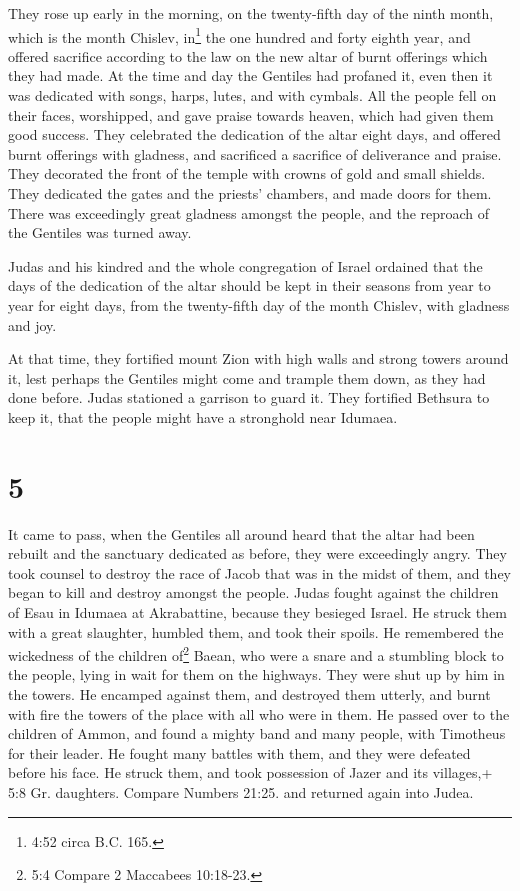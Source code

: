 They rose up early in the morning, on the twenty-fifth day
of the ninth month, which is the month Chislev, in\footnote{4:52 circa
  B.C. 165.} the one hundred and forty eighth year,  and
offered sacrifice according to the law on the new altar of burnt
offerings which they had made.  At the time and day the
Gentiles had profaned it, even then it was dedicated with songs, harps,
lutes, and with cymbals.  All the people fell on their
faces, worshipped, and gave praise towards heaven, which had given them
good success.  They celebrated the dedication of the altar
eight days, and offered burnt offerings with gladness, and sacrificed a
sacrifice of deliverance and praise.  They decorated the
front of the temple with crowns of gold and small shields. They
dedicated the gates and the priests' chambers, and made doors for them.
 There was exceedingly great gladness amongst the people,
and the reproach of the Gentiles was turned away.

 Judas and his kindred and the whole congregation of Israel
ordained that the days of the dedication of the altar should be kept in
their seasons from year to year for eight days, from the twenty-fifth
day of the month Chislev, with gladness and joy.

 At that time, they fortified mount Zion with high walls
and strong towers around it, lest perhaps the Gentiles might come and
trample them down, as they had done before.  Judas
stationed a garrison to guard it. They fortified Bethsura to keep it,
that the people might have a stronghold near Idumaea.

\hypertarget{section-4}{%
\section{5}\label{section-4}}

 It came to pass, when the Gentiles all around heard that
the altar had been rebuilt and the sanctuary dedicated as before, they
were exceedingly angry.  They took counsel to destroy the
race of Jacob that was in the midst of them, and they began to kill and
destroy amongst the people.  Judas fought against the
children of Esau in Idumaea at Akrabattine, because they besieged
Israel. He struck them with a great slaughter, humbled them, and took
their spoils.  He remembered the wickedness of the children
of\footnote{5:4 Compare 2 Maccabees 10:18-23.} Baean, who were a snare
and a stumbling block to the people, lying in wait for them on the
highways.  They were shut up by him in the towers. He
encamped against them, and destroyed them utterly, and burnt with fire
the towers of the place with all who were in them.  He
passed over to the children of Ammon, and found a mighty band and many
people, with Timotheus for their leader.  He fought many
battles with them, and they were defeated before his face. He struck
them,  and took possession of Jazer and its villages,+ 5:8
Gr. daughters. Compare Numbers 21:25. and returned again into Judea.

